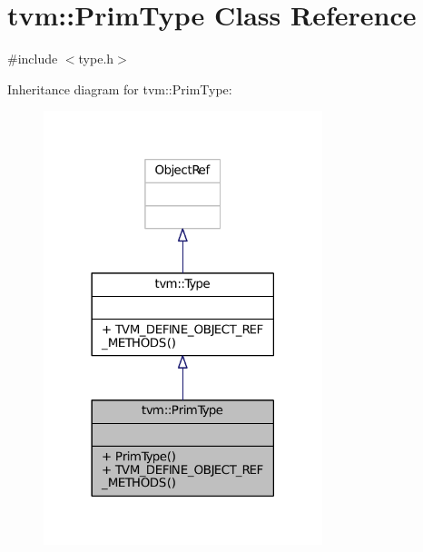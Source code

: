 \hypertarget{classtvm_1_1PrimType}{}\section{tvm\+:\+:Prim\+Type Class Reference}
\label{classtvm_1_1PrimType}


{\ttfamily \#include $<$type.\+h$>$}



Inheritance diagram for tvm\+:\+:Prim\+Type\+:
\nopagebreak
\begin{figure}[H]
\begin{center}
\leavevmode
\includegraphics[width=230pt]{classtvm_1_1PrimType__inherit__graph}
\end{center}
\end{figure}


